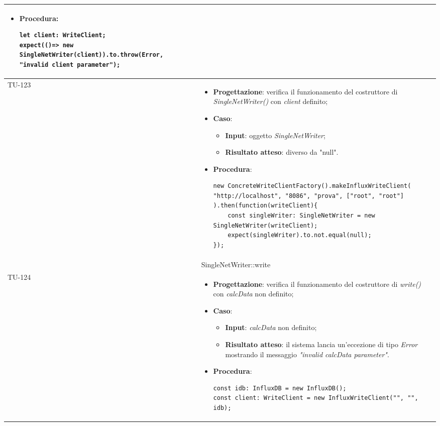 \begin{longtable}{|C{1.5cm}|C{14.5cm}|}
\begin{itemize}
\begin{itemize}
	\end{itemize}
	\item \textbf{Procedura}:
	\begin{lstlisting}
let client: WriteClient;
expect(()=> new SingleNetWriter(client)).to.throw(Error, "invalid client parameter");
	\end{lstlisting}
\end{itemize}\\
\hline
{TU-123} &
\begin{itemize}
	\item \textbf{Progettazione}: verifica il funzionamento del costruttore di \emph{SingleNetWriter()} con \emph{client} definito;
	\item \textbf{Caso}: 
	\begin{itemize}
		\item \textbf{Input}: oggetto \emph{SingleNetWriter};
		\item \textbf{Risultato atteso}: diverso da "null".
	\end{itemize}
	\item \textbf{Procedura}:
	\begin{lstlisting}
new ConcreteWriteClientFactory().makeInfluxWriteClient(
"http://localhost", "8086", "prova", ["root", "root"]
).then(function(writeClient){
	const singleWriter: SingleNetWriter = new SingleNetWriter(writeClient);
	expect(singleWriter).to.not.equal(null);
});
	\end{lstlisting}
\end{itemize}\\
\hline
{} & SingleNetWriter::write
\\ \hline
{TU-124} &
\begin{itemize}
	\item \textbf{Progettazione}: verifica il funzionamento del costruttore di \emph{write()} con \emph{calcData} non definito;
	\item \textbf{Caso}: 
	\begin{itemize}
		\item \textbf{Input}: \emph{calcData} non definito;
		\item \textbf{Risultato atteso}: il sistema lancia un'eccezione di tipo \emph{Error} mostrando il messaggio \emph{"invalid calcData parameter"}.
	\end{itemize}
	\item \textbf{Procedura}:
	\begin{lstlisting}
const idb: InfluxDB = new InfluxDB();
const client: WriteClient = new InfluxWriteClient("", "", idb);

\end{lstlisting}
\end{itemize}
\end{longtable}
